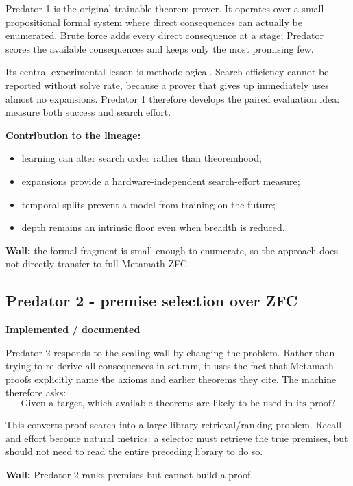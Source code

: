 \documentclass[11pt]{article}
\newcommand{\implemented}{\textbf{Implemented / documented}}
\begin{document}
Predator 1 is the original trainable theorem prover. It operates over a small propositional formal system where direct consequences can actually be enumerated. Brute force adds every direct consequence at a stage; Predator scores the available consequences and keeps only the most promising few.

Its central experimental lesson is methodological. Search efficiency cannot be reported without solve rate, because a prover that gives up immediately uses almost no expansions. Predator 1 therefore develops the paired evaluation idea: measure both success and search effort.

\textbf{Contribution to the lineage:}
\begin{itemize}
\item learning can alter search order rather than theoremhood;
\item expansions provide a hardware-independent search-effort measure;
\item temporal splits prevent a model from training on the future;
\item depth remains an intrinsic floor even when breadth is reduced.
\end{itemize}

\textbf{Wall:} the formal fragment is small enough to enumerate, so the approach does not directly transfer to full Metamath ZFC.

\subsection{Predator 2 - premise selection over ZFC}

\begin{statusbox}\implemented\end{statusbox}

Predator 2 responds to the scaling wall by changing the problem. Rather than trying to re-derive all consequences in set.mm, it uses the fact that Metamath proofs explicitly name the axioms and earlier theorems they cite. The machine therefore asks:
\[
\text{Given a target, which available theorems are likely to be used in its proof?}
\]

This converts proof search into a large-library retrieval/ranking problem. Recall and effort become natural metrics: a selector must retrieve the true premises, but should not need to read the entire preceding library to do so.

\textbf{Wall:} Predator 2 ranks premises but cannot build a proof.
\end{document}
